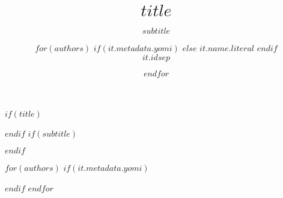 \makeatletter
\renewcommand{\maketitle}{
    \begin{titlepage}
        \begin{center}
        $if(thesis-info.year)${\Large $thesis-info.year$ \par}$endif$%
        $if(thesis-info.type)${\Large $thesis-info.type$ \par}$endif$%
        \vfill
        {\huge\bfseries\@title}$if(subtitle)$\par
        \vspace{0.5cm}
        {\Large\bfseries\bxjs@subtitle}$endif$\\
        \vspace{4cm}
        {\Large
          \lineskip .75em
          \begin{tabular}[t]{c}%
            \@author
          \end{tabular}\par}
        \vfill
        $if(thesis-info.university)${\Large $thesis-info.university$ \par}$endif$%
        $if(thesis-info.department)${\Large $thesis-info.department$ \par}$endif$%
        $if(thesis-info.seminar)${\Large $thesis-info.seminar$ \par}$endif$%
        \end{center}
        $if(date)$\vfill\hfill\small $date$$endif$
    \end{titlepage}
}
\makeatother

$if(title)$\title{$title$}$endif$
$if(subtitle)$\subtitle{$subtitle$}$endif$

$for(authors)$
$if(it.metadata.yomi)$
\usepackage{pxrubrica}
$endif$
$endfor$

\author{$for(authors)$
    {\Large 
        $if(it.metadata.yomi)$
        $else$
            $it.name.literal$
        $endif$
    }\\
    $it.id$$sep$ \and 
$endfor$}

